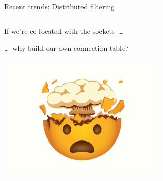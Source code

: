 \documentclass[black,white]{beamer}
\newcommand\blfootnote[1]{%
  \begingroup
  \renewcommand\thefootnote{}\footnote{#1}%
  \addtocounter{footnote}{-1}%
  \endgroup
}
\begin{document}
\begin{frame}{Recent trends: Distributed filtering}
\begin{columns}[c]
\begin{column}{0.5\textwidth}
            \end{column}
        \end{columns}
    \end{frame}


    \begin{frame}{If we're co-located with the sockets~\ldots}
        \begin{flushright}
            \ldots~why build our own connection table? \medskip
        \end{flushright}
	\begin{center}
        \includegraphics[width=0.6\textwidth]{mindblown.png}
	\end{center}
    \end{frame}
\end{document}
